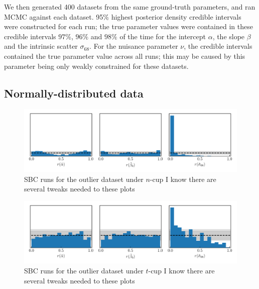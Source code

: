 \documentclass[fleqn,usenatbib]{rasti}
\begin{document}
We then generated 400 datasets from the same ground-truth parameters, and ran
MCMC against each dataset.
95\% highest posterior density credible intervals were constructed for each run;
the true parameter values were contained in these credible intervals $97\%$,
$96\%$ and $98\%$ of the time for the intercept $\alpha$, the slope $\beta$ and
the intrinsic scatter $\sigma_{68}$. For the nuisance parameter $\nu$, the
credible intervals contained the true parameter value across all runs; this may
be caused by this parameter being only weakly constrained for these datasets.

\subsection{Normally-distributed data}
\label{sec:results.outlier}

\begin{figure}
    \includegraphics[width=\textwidth]{graphics/sbc/ncup/outlier20/sbc.pdf}
    \caption{SBC runs for the outlier dataset under $n$-cup {\color{red} I know
    there are several tweaks needed to these plots}}
    \label{fig:results.outlier.ncup-sbc}
\end{figure}

\begin{figure}
    \includegraphics[width=\textwidth]{graphics/sbc/tcup/outlier20/sbc.pdf}
    \caption{SBC runs for the outlier dataset under $t$-cup {\color{red} I know
    there are several tweaks needed to these plots}}
    \label{fig:results.outlier.tcup-sbc}
\end{figure}
\end{document}
